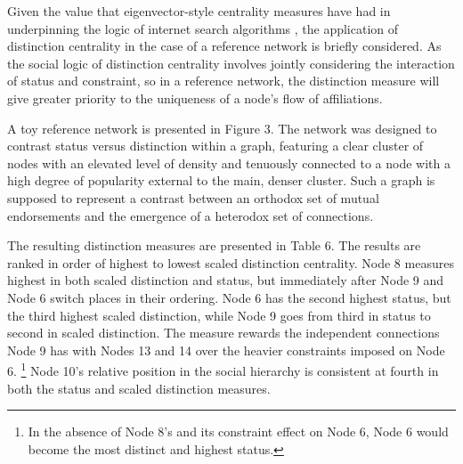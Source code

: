 \documentclass[12pt]{article}
\begin{document}
Given the value that eigenvector-style centrality measures have had in underpinning the logic of internet search algorithms \citep{kleinberg99, brin_page98, langville2005survey-572}, the application of distinction centrality in the case of a reference network is briefly considered. As the social logic of distinction centrality involves jointly considering the interaction of status and constraint, so in a reference network, the distinction measure will give greater priority to the uniqueness of a node's flow of affiliations. 

A toy reference network is presented in Figure 3. The network was designed to contrast status versus distinction within a graph, featuring a clear cluster of nodes with an elevated level of density and tenuously connected to a node with a high degree of popularity external to the main, denser cluster. Such a graph is supposed to represent a contrast between an orthodox set of mutual endorsements and the emergence of a heterodox set of connections.

The resulting distinction measures are presented in Table 6. The results are ranked in order of highest to lowest scaled distinction centrality. Node 8 measures highest in both scaled distinction and status, but immediately after Node 9 and Node 6 switch places in their ordering. Node 6 has the second highest status, but the third highest scaled distinction, while Node 9 goes from third in status to second in scaled distinction. The measure rewards the independent connections Node 9 has with Nodes 13 and 14 over the heavier constraints imposed on Node 6. \footnote{In the absence of Node 8's and its constraint effect on Node 6, Node 6 would become the most distinct and highest status.} Node 10's relative position in the social hierarchy is consistent at fourth in both the status and scaled distinction measures.
\end{document}
